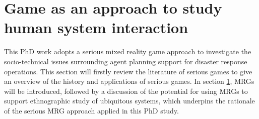 \section{Game as an approach to study human system interaction } \label{sec:LRMRgame}
This PhD work adopts a serious mixed reality game approach to investigate the socio-technical issues surrounding agent planning support for disaster response operations. This section will firstly review the literature of serious games to give an overview of the history and applications of serious games. In section \ref{sec:LRMRgame}, \acf{MRG}s will be introduced, followed by a discussion of the potential for using \ac{MRG}s to support ethnographic study of ubiquitous systems, which underpins the rationale of the serious \ac{MRG} approach applied in this PhD study.\\ 



